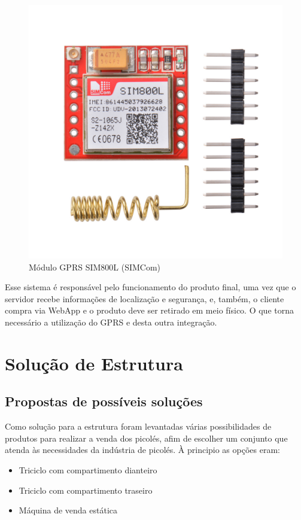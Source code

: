 \begin{figure}[H]
	\centering
    \includegraphics[scale=0.25]{figuras/modulo_gprs}
    \caption{Módulo GPRS SIM800L (SIMCom)}
    \label{fig:modulo_gprs}
\end{figure}

Esse sistema é responsável pelo funcionamento do produto final, uma vez que o servidor recebe informações de localização e segurança, e, também, o cliente compra via WebApp e o produto deve ser retirado em meio físico. O que torna necessário a utilização do GPRS e desta outra integração. 

\section{Solução de Estrutura}

\subsection{Propostas de possíveis soluções}
Como solução para a estrutura foram levantadas várias possibilidades de produtos para realizar a venda dos picolés, afim de escolher um conjunto que atenda às necessidades da indústria de picolés. À principio as opções eram:

\begin{itemize}
\item Triciclo com compartimento dianteiro
\item Triciclo com compartimento traseiro
\item Máquina de venda estática
\end{itemize}


